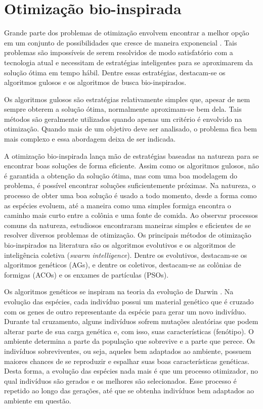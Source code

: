 \chapter[Otimização bio-inspirada]{Otimização bio-inspirada}

Grande parte dos problemas de otimização envolvem encontrar a melhor opção em um conjunto de possibilidades que cresce de maneira exponencial \cite{Viggo1992}. Tais problemas são impossíveis de serem resolvidos de modo satisfatório com a tecnologia atual e necessitam de estratégias inteligentes para se aproximarem da solução ótima em tempo hábil. Dentre essas estratégias, destacam-se os algoritmos gulosos e os algoritmos de busca bio-inspirados.

Os algoritmos gulosos \cite{GreedyAlgorithms} são estratégias relativamente simples que, apesar de nem sempre obterem a solução ótima, normalmente aproximam-se bem dela. Tais métodos são geralmente utilizados quando apenas um critério é envolvido na otimização. Quando mais de um objetivo deve ser analisado, o problema fica bem mais complexo e essa abordagem deixa de ser indicada.

A otimização bio-inspirada \cite{BioInspiredOptimization} lança mão de estratégias baseadas na natureza para se encontrar boas soluções de forma eficiente. Assim como os algoritmos gulosos, não é garantida a obtenção da solução ótima, mas com uma boa modelagem do problema, é possível encontrar soluções suficientemente próximas. Na natureza, o processo de obter uma boa solução é usado a todo momento, desde a forma como as espécies evoluem, até a maneira como uma simples formiga encontra o caminho mais curto entre a colônia e uma fonte de comida. Ao observar processos comuns da natureza, estudiosos encontraram maneiras simples e eficientes de se resolver diversos problemas de otimização. Os principais métodos de otimização bio-inspirados na literatura são os algoritmos evolutivos e os algoritmos de inteligência coletiva (\textit{swarm intelligence}). Dentre os evolutivos, destacam-se os algoritmos genéticos (AGs), e dentre os coletivos, destacam-se as colônias de formigas (ACOs) e os enxames de partículas (PSOs).

Os algoritmos genéticos se inspiram na teoria da evolução de Darwin \cite{Darwin1859}. Na evolução das espécies, cada indivíduo possui um material genético que é cruzado com os genes de outro representante da espécie para gerar um novo indivíduo. Durante tal cruzamento, alguns indivíduos sofrem mutações aleatórias que podem alterar parte de sua carga genética e, com isso, suas características (fenótipo). O ambiente determina a parte da população que sobrevive e a parte que perece. Os indivíduos sobreviventes, ou seja, aqueles bem adaptados ao ambiente, possuem maiores chances de se reproduzir e espalhar suas boas características genéticas. Desta forma, a evolução das espécies nada mais é que um processo otimizador, no qual indivíduos são gerados e os melhores são selecionados. Esse processo é repetido ao longo das gerações, até que se obtenha indivíduos bem adaptados ao ambiente em questão.

